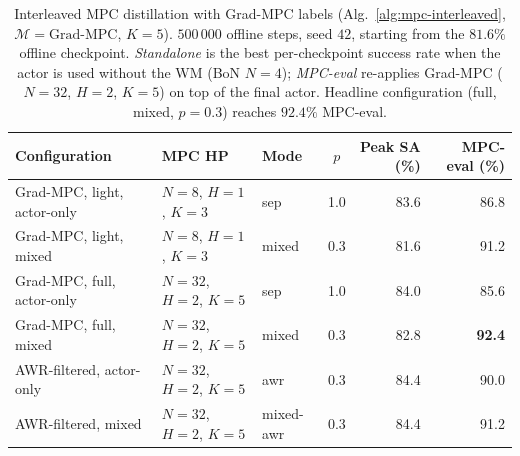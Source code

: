 \begin{table}[h]
\centering
\caption{Interleaved MPC distillation with Grad-MPC labels (Alg.~\ref{alg:mpc-interleaved}, $\mathcal{M} = \text{Grad-MPC}$, $K = 5$).
   $500\,000$ offline steps, seed $42$, starting from the $81.6\%$ offline checkpoint. \emph{Standalone} is the best per-checkpoint success rate
   when the actor is used without the WM (BoN $N = 4$); \emph{MPC-eval} re-applies Grad-MPC ($N = 32$, $H = 2$, $K = 5$) on top of the final actor.
   Headline configuration (full, mixed, $p = 0.3$) reaches $\mathbf{92.4\%}$ MPC-eval.}
\label{tab:mpc-interleaved}
\begin{tabular}{l l l c r r}
\toprule
Configuration & MPC HP & Mode & $p$ & Peak SA (\%) & MPC-eval (\%) \\
\midrule
Grad-MPC, light, actor-only  & $N{=}8$, $H{=}1$, $K{=}3$   & sep   & 1.0 & 83.6 & 86.8 \\
Grad-MPC, light, mixed       & $N{=}8$, $H{=}1$, $K{=}3$   & mixed & 0.3 & 81.6 & 91.2 \\
Grad-MPC, full, actor-only   & $N{=}32$, $H{=}2$, $K{=}5$  & sep   & 1.0 & 84.0 & 85.6 \\
Grad-MPC, full, mixed        & $N{=}32$, $H{=}2$, $K{=}5$  & mixed & 0.3 & 82.8 & \textbf{92.4} \\
AWR-filtered, actor-only     & $N{=}32$, $H{=}2$, $K{=}5$  & awr   & 0.3 & 84.4 & 90.0 \\
AWR-filtered, mixed          & $N{=}32$, $H{=}2$, $K{=}5$  & mixed-awr & 0.3 & 84.4 & 91.2 \\
\bottomrule
\end{tabular}
\end{table}

